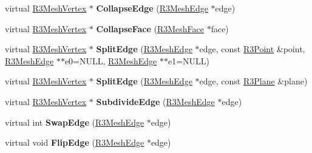 \begin{DoxyCompactItemize}
\item 
virtual \hyperlink{class_r3_mesh_vertex}{R3\+Mesh\+Vertex} $\ast$ {\bfseries Collapse\+Edge} (\hyperlink{class_r3_mesh_edge}{R3\+Mesh\+Edge} $\ast$edge)\hypertarget{class_r3_mesh_accbb762e0995e971e4184f8d2eeb3920}{}\label{class_r3_mesh_accbb762e0995e971e4184f8d2eeb3920}

\item 
virtual \hyperlink{class_r3_mesh_vertex}{R3\+Mesh\+Vertex} $\ast$ {\bfseries Collapse\+Face} (\hyperlink{class_r3_mesh_face}{R3\+Mesh\+Face} $\ast$face)\hypertarget{class_r3_mesh_a77e30e67d0f7cdeb7f7c36ca5dc2b46e}{}\label{class_r3_mesh_a77e30e67d0f7cdeb7f7c36ca5dc2b46e}

\item 
virtual \hyperlink{class_r3_mesh_vertex}{R3\+Mesh\+Vertex} $\ast$ {\bfseries Split\+Edge} (\hyperlink{class_r3_mesh_edge}{R3\+Mesh\+Edge} $\ast$edge, const \hyperlink{class_r3_point}{R3\+Point} \&point, \hyperlink{class_r3_mesh_edge}{R3\+Mesh\+Edge} $\ast$$\ast$e0=N\+U\+LL, \hyperlink{class_r3_mesh_edge}{R3\+Mesh\+Edge} $\ast$$\ast$e1=N\+U\+LL)\hypertarget{class_r3_mesh_ac55d4497d640200dfb9bc9721667d53f}{}\label{class_r3_mesh_ac55d4497d640200dfb9bc9721667d53f}

\item 
virtual \hyperlink{class_r3_mesh_vertex}{R3\+Mesh\+Vertex} $\ast$ {\bfseries Split\+Edge} (\hyperlink{class_r3_mesh_edge}{R3\+Mesh\+Edge} $\ast$edge, const \hyperlink{class_r3_plane}{R3\+Plane} \&plane)\hypertarget{class_r3_mesh_a73433f7f60b9da66742c06ff49e07cd1}{}\label{class_r3_mesh_a73433f7f60b9da66742c06ff49e07cd1}

\item 
virtual \hyperlink{class_r3_mesh_vertex}{R3\+Mesh\+Vertex} $\ast$ {\bfseries Subdivide\+Edge} (\hyperlink{class_r3_mesh_edge}{R3\+Mesh\+Edge} $\ast$edge)\hypertarget{class_r3_mesh_a86b74c6d9e1fa473c4b9ae0a2debbd51}{}\label{class_r3_mesh_a86b74c6d9e1fa473c4b9ae0a2debbd51}

\item 
virtual int {\bfseries Swap\+Edge} (\hyperlink{class_r3_mesh_edge}{R3\+Mesh\+Edge} $\ast$edge)\hypertarget{class_r3_mesh_a66ae7c5a05e7e91e748c5278c4f8458f}{}\label{class_r3_mesh_a66ae7c5a05e7e91e748c5278c4f8458f}

\item 
virtual void {\bfseries Flip\+Edge} (\hyperlink{class_r3_mesh_edge}{R3\+Mesh\+Edge} $\ast$edge)\hypertarget{class_r3_mesh_a9593f2d3a1785b3396962f9d7ce998b2}{}\label{class_r3_mesh_a9593f2d3a1785b3396962f9d7ce998b2}


\end{DoxyCompactItemize}

